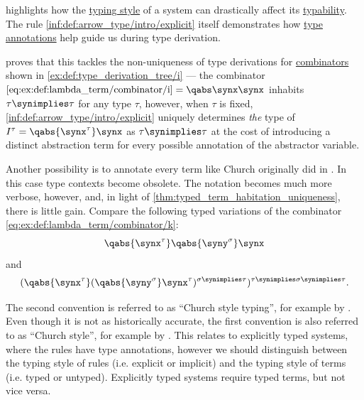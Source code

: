 \begin{remark}\label{rem:typing_style}
   highlights how the \hyperref[def:simple_type_system_style]{typing style} of a system can drastically affect its \hyperref[def:typability]{typability}. The rule \ref{inf:def:arrow_type/intro/explicit} itself demonstrates how \hyperref[con:type_annotation]{type annotations} help guide us during type derivation.

   proves that this tackles the non-uniqueness of type derivations for \hyperref[def:lambda_combinator]{combinators} shown in \cref{ex:def:type_derivation_tree/i} --- the combinator \( \ref{eq:ex:def:lambda_term/combinator/i} = \qabs \synx \synx \) inhabits \( \tau \synimplies \tau \) for any type \( \tau \), however, when \( \tau \) is fixed, \ref{inf:def:arrow_type/intro/explicit} uniquely determines \emph{the} type of \( I^\tau = \qabs {\synx^\tau} \synx \) as \( \tau \synimplies \tau \) at the cost of introducing a distinct abstraction term for every possible annotation of the abstractor variable.

  Another possibility is to annotate every term like Church originally did in \cite{Church1940STT}. In this case type contexts become obsolete. The notation becomes much more verbose, however, and, in light of \cref{thm:typed_term_habitation_uniqueness}, there is little gain. Compare the following typed variations of the combinator \ref{eq:ex:def:lambda_term/combinator/k}:
  \begin{equation*}
    \qabs {\synx^\tau} \qabs {\syny^\sigma} \synx
  \end{equation*}
  and
  \begin{equation*}
    (\qabs {\synx^\tau} (\qabs {\syny^\sigma} \synx^\tau)^{\sigma \synimplies \tau})^{\tau \synimplies \sigma \synimplies \tau}.
  \end{equation*}

  The second convention is referred to as \enquote{Church style typing}, for example by \cite[ch. 5]{Hindley1997BasicSTT}. Even though it is not as historically accurate, the first convention is also referred to as \enquote{Church style}, for example by \textcite[ch. 4]{Mimram2020ProgramEqualsProof}. This relates to explicitly typed systems, where the rules have type annotations, however we should distinguish between the typing style of rules (i.e. explicit or implicit) and the typing style of terms (i.e. typed or untyped). Explicitly typed systems require typed terms, but not vice versa.


\end{remark}
